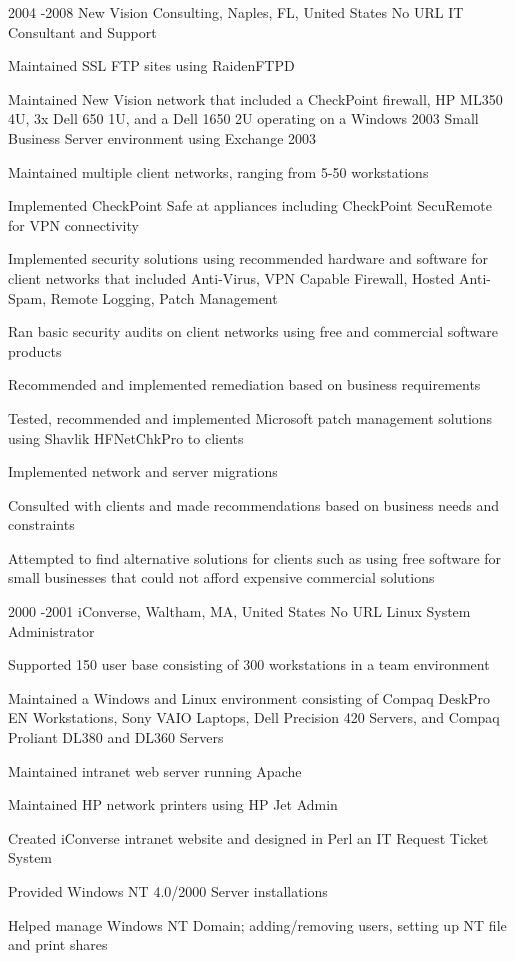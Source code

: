 \documentclass[10pt]{article} %
\begin{document}

\job
{2004 -}{2008}
{New Vision Consulting, Naples, FL, United States}
{No URL}
{IT Consultant and Support}
{\begin{itemize-noindent}
\item{Maintained SSL FTP sites using RaidenFTPD}
\item{Maintained New Vision network that included a CheckPoint firewall, HP ML350 4U, 3x Dell 650 1U, and a Dell 1650 2U operating on a Windows 2003 Small Business Server environment using Exchange 2003}
\item{Maintained multiple client networks, ranging from 5-50 workstations}
\item{Implemented CheckPoint Safe at appliances including CheckPoint SecuRemote for VPN connectivity}
\item{Implemented security solutions using recommended hardware and software for client networks that included Anti-Virus, VPN Capable Firewall, Hosted Anti-Spam, Remote Logging, Patch Management}
\item{Ran basic security audits on client networks using free and commercial software products}
\item{Recommended and implemented remediation based on business requirements}
\item{Tested, recommended and implemented Microsoft patch management solutions using Shavlik HFNetChkPro to clients}
\item{Implemented network and server migrations}
\item{Consulted with clients and made recommendations based on business needs and constraints}
\item{Attempted to find alternative solutions for clients such as using free software for small businesses that could not afford expensive commercial solutions}
\end{itemize-noindent}}

\pagebreak

\job
{2000 -}{2001}
{iConverse, Waltham, MA, United States}
{No URL}
{Linux System Administrator}
{\begin{itemize-noindent}
\item{Supported 150 user base consisting of 300 workstations in a team environment}
\item{Maintained a Windows and Linux environment consisting of Compaq DeskPro EN Workstations, Sony VAIO Laptops, Dell Precision 420 Servers, and Compaq Proliant DL380 and DL360 Servers}
\item{Maintained intranet web server running Apache}
\item{Maintained HP network printers using HP Jet Admin}
\item{Created iConverse intranet website and designed in Perl an IT Request Ticket System}
\item{Provided Windows NT 4.0/2000 Server installations}
\item{Helped manage Windows NT Domain; adding/removing users, setting up NT file and print shares}
\end{itemize-noindent}}

\end{document}
